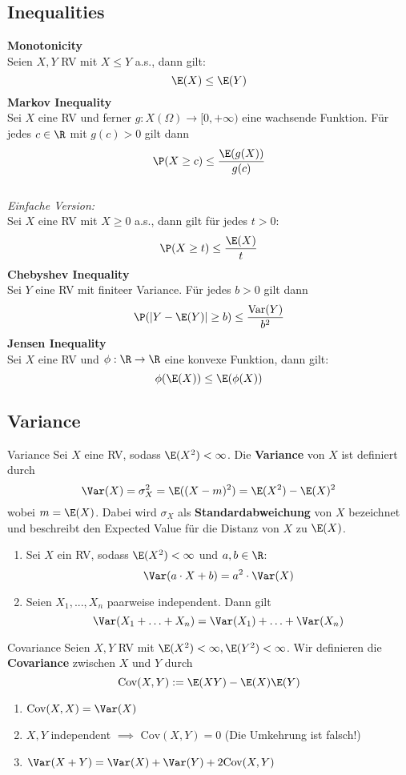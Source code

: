 \subsection{Inequalities}
\textbf{Monotonicity}
\\Seien $X, Y$ RV mit $X \leq Y$ a.s., dann gilt:
$$\E(X) \leq \E(Y)$$
\textbf{Markov Inequality}
\\Sei $X$ eine RV und ferner $g: X(\Omega) \to [0, +\infty)$ eine wachsende Funktion. Für jedes $c \in \R$ mit $g(c) > 0$ gilt dann
$$\P(X \geq c) \leq \frac{\E(g(X))}{g(c)}$$
\\\textit{Einfache Version:}
\\Sei $X$ eine RV mit $X\geq 0$ a.s., dann gilt für jedes $t > 0$:
$$\P(X \geq t) \leq \frac{\E(X)}{t}$$
\textbf{Chebyshev Inequality}
\\Sei $Y$ eine RV mit finiteer Variance. Für jedes $b > 0$ gilt dann
$$\P(|Y - \E(Y)| \geq b) \leq \frac{\text{Var}(Y)}{b^2}$$
\textbf{Jensen Inequality}
\\Sei $X$ eine RV und $\phi: \R \to \R$ eine konvexe Funktion, dann gilt:
$$\phi(\E(X)) \leq \E(\phi(X))$$

\subsection{Variance}
\begin{mainbox}{Variance}
    Sei $X$ eine RV, sodass $\E(X^2)<\infty$. Die \textbf{Variance} von $X$ ist definiert durch
    $$\Var(X) = \sigma_X^2 = \E((X - m)^2) = \E(X^2)-\E(X)^2$$
    wobei $m = \E(X)$. Dabei wird $\sigma_X$ als \textbf{Standardabweichung} von $X$ bezeichnet und beschreibt den Expected Value für die Distanz von $X$ zu $\E(X)$.
\end{mainbox}

\begin{enumerate}
    \item Sei $X$ ein RV, sodass $\E(X^2)<\infty$ und $a, b \in \R$:
    $$\Var(a\cdot X + b) = a^2 \cdot \Var(X)$$
    \item Seien $X_1, ..., X_n$ paarweise independent. Dann gilt
    $$\Var(X_1 + \ldots + X_n) = \Var(X_1)+\ldots +\Var(X_n)$$
\end{enumerate}

\begin{mainbox}{Covariance}
    Seien $X, Y$ RV mit $\E(X^2)<\infty, \E(Y^2) < \infty$. Wir definieren die \textbf{Covariance} zwischen $X$ und $Y$ durch
    $$\text{Cov}(X,Y) := \E(XY) - \E(X)\E(Y)$$
\end{mainbox}
\begin{enumerate}
    \item $\text{Cov}(X,X) = \Var(X)$
    \item $X, Y$ independent $\implies$ $\text{Cov}(X, Y) = 0$ (Die Umkehrung ist falsch!)
    \item $\Var(X+Y) = \Var(X) + \Var(Y) + 2\text{Cov}(X, Y)$
\end{enumerate}

